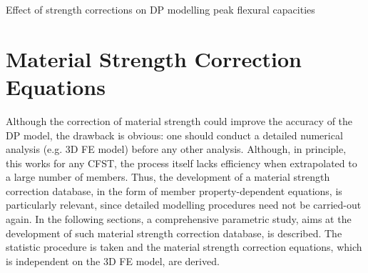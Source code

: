 \documentclass[12pt,a4]{article}
\begin{document}
	\par
	\begin{table}
		\caption{Effect of strength corrections on DP modelling peak flexural capacities}
		\label{tb-3}
	\end{table}
	\par
	\section{Material Strength Correction Equations}
	Although the correction of material strength could improve the accuracy of the DP model, the drawback is obvious: one should conduct a detailed numerical analysis (e.g. 3D FE model) before any other analysis. Although, in principle, this works for any CFST, the process itself lacks efficiency when extrapolated to a large number of members. Thus, the development of a material strength correction database, in the form of member property-dependent equations, is particularly relevant, since detailed modelling procedures need not be carried-out again. In the following sections, a comprehensive parametric study, aims at the development of such material strength correction database, is described. The statistic procedure is taken and the material strength correction equations, which is independent on the 3D FE model, are derived.
\end{document}
